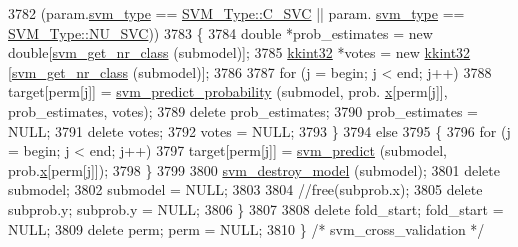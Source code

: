 \begin{DoxyCode}
3782        (param.\hyperlink{struct_s_v_m289___m_f_s_1_1svm__parameter_a803dee598ce609cc4ccb4fdbfa99cd1b}{svm\_type} == \hyperlink{namespace_s_v_m233_acde4c278f323c82a6b41c27f6f30738aa942f03bda3ae7dbb9e945f161c95ab97}{SVM\_Type::C\_SVC} || param.
      \hyperlink{struct_s_v_m289___m_f_s_1_1svm__parameter_a803dee598ce609cc4ccb4fdbfa99cd1b}{svm\_type} == \hyperlink{namespace_s_v_m233_acde4c278f323c82a6b41c27f6f30738aa7705bf71b9d3c7169b4d201acb2b30b8}{SVM\_Type::NU\_SVC}))
3783     \{
3784       \textcolor{keywordtype}{double} *prob\_estimates = \textcolor{keyword}{new} \textcolor{keywordtype}{double}[\hyperlink{svm_8cpp_a8899c9bff7d0e5d840e33a6c66eec1cd}{svm\_get\_nr\_class} (submodel)];
3785       \hyperlink{namespace_k_k_b_a8fa4952cc84fda1de4bec1fbdd8d5b1b}{kkint32}  *votes          = \textcolor{keyword}{new} \hyperlink{namespace_k_k_b_a8fa4952cc84fda1de4bec1fbdd8d5b1b}{kkint32} [\hyperlink{svm_8cpp_a8899c9bff7d0e5d840e33a6c66eec1cd}{svm\_get\_nr\_class} (submodel)];
3786 
3787       \textcolor{keywordflow}{for}  (j = begin;  j < end;  j++)
3788         target[perm[j]] = \hyperlink{namespace_s_v_m289___m_f_s_ac0623d29bd02989f751e50d1cb3c8855}{svm\_predict\_probability} (submodel, prob.
      \hyperlink{struct_s_v_m289___m_f_s_1_1svm__problem_a7bca932b51ca89f6820225e8e9c1bd35}{x}[perm[j]], prob\_estimates, votes);
3789       \textcolor{keyword}{delete}  prob\_estimates;
3790       prob\_estimates = NULL;
3791       \textcolor{keyword}{delete}  votes;
3792       votes = NULL;
3793     \}
3794     \textcolor{keywordflow}{else}
3795     \{
3796       \textcolor{keywordflow}{for}  (j = begin;  j < end;  j++)
3797         target[perm[j]] = \hyperlink{namespace_s_v_m233_a7f194ec68b77ae5069b5a601d3870371}{svm\_predict} (submodel, prob.\hyperlink{struct_s_v_m289___m_f_s_1_1svm__problem_a7bca932b51ca89f6820225e8e9c1bd35}{x}[perm[j]]);
3798     \}
3799 
3800     \hyperlink{namespace_s_v_m233_ae4315496ae1099c8ec84268ccf7b5d14}{svm\_destroy\_model} (submodel);
3801     \textcolor{keyword}{delete}  submodel;
3802     submodel = NULL;
3803 
3804     \textcolor{comment}{//free(subprob.x);}
3805     \textcolor{keyword}{delete}  subprob.y;   subprob.y = NULL;
3806   \}    
3807 
3808   \textcolor{keyword}{delete} fold\_start;  fold\_start = NULL;
3809   \textcolor{keyword}{delete} perm;        perm       = NULL;
3810 \}  \textcolor{comment}{/* svm\_cross\_validation */}
\end{DoxyCode}

